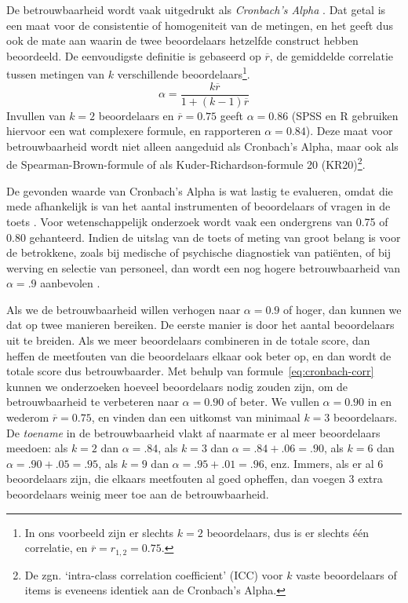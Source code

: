 \documentclass[
]{book}
\begin{document}
De betrouwbaarheid wordt vaak uitgedrukt als \emph{Cronbach's Alpha}
\citep{Cort93}. Dat getal is een maat voor de consistentie of homogeniteit
van de metingen, en het geeft dus ook de mate aan waarin de twee
beoordelaars hetzelfde construct hebben beoordeeld. De eenvoudigste
definitie is gebaseerd op \(\overline{r}\), de gemiddelde correlatie
tussen metingen van \(k\) verschillende beoordelaars\footnote{In ons voorbeeld zijn er slechts \(k=2\) beoordelaars, dus is er slechts één correlatie, en \(\overline{r} = r_{1,2} = 0.75\).}.
\begin{equation}
  \label{eq:cronbach-corr}
  \alpha = \frac{k \overline{r}} {1+(k-1)\overline{r}}
\end{equation}
Invullen van \(k=2\) beoordelaars en \(\overline{r}=0.75\) geeft \(\alpha=0.86\) (SPSS en R
gebruiken hiervoor een wat complexere formule, en rapporteren
\(\alpha=0.84\)). Deze maat voor betrouwbaarheid wordt niet alleen
aangeduid als Cronbach's Alpha, maar ook als de Spearman-Brown-formule
of als Kuder-Richardson-formule 20 (KR20)\footnote{De zgn. `intra-class correlation coefficient' (ICC) voor \(k\) vaste beoordelaars of items is eveneens identiek aan de Cronbach's Alpha.}.

De gevonden waarde van Cronbach's Alpha is wat lastig te evalueren,
omdat die mede afhankelijk is van het aantal instrumenten of
beoordelaars of vragen in de toets \citep{Cort93, Glin01}. Voor
wetenschappelijk onderzoek wordt vaak een ondergrens van 0.75 of 0.80
gehanteerd. Indien de uitslag van de toets of meting van groot belang is
voor de betrokkene, zoals bij medische of psychische diagnostiek van
patiënten, of bij werving en selectie van personeel, dan wordt een nog
hogere betrouwbaarheid van \(\alpha=.9\) aanbevolen \citep{Glin01}.

Als we de betrouwbaarheid willen verhogen naar \(\alpha=0.9\) of hoger,
dan kunnen we dat op twee manieren bereiken. De eerste manier is door
het aantal beoordelaars uit te breiden. Als we meer beoordelaars
combineren in de totale score, dan heffen de meetfouten van die
beoordelaars elkaar ook beter op, en dan wordt de totale score dus
betrouwbaarder. Met behulp van
formule~\eqref{eq:cronbach-corr} kunnen we onderzoeken hoeveel beoordelaars
nodig zouden zijn, om de betrouwbaarheid te verbeteren naar
\(\alpha=0.90\) of beter. We vullen \(\alpha=0.90\) in en wederom
\(\overline{r}=0.75\), en vinden dan een uitkomst van minimaal \(k=3\)
beoordelaars. De \emph{toename} in de betrouwbaarheid vlakt af naarmate er al
meer beoordelaars meedoen: als \(k=2\) dan \(\alpha=.84\), als \(k=3\) dan
\(\alpha=.84+.06=.90\), als \(k=6\) dan \(\alpha=.90+.05=.95\), als \(k=9\) dan
\(\alpha=.95+.01=.96\), enz. Immers, als er al 6 beoordelaars zijn, die
elkaars meetfouten al goed opheffen, dan voegen 3 extra beoordelaars
weinig meer toe aan de betrouwbaarheid.
\end{document}

